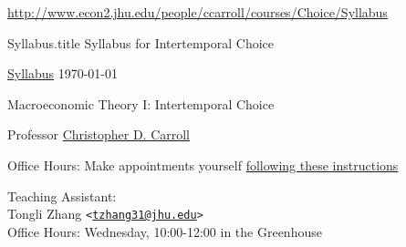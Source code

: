 \documentclass{\econtex}\newcommand{\texname}{Syllabus}
\begin{document}
\large
\begin{center}{{\tiny \url{http://www.econ2.jhu.edu/people/ccarroll/courses/Choice/Syllabus}}}\end{center}


\begin{verbatimwrite}{\texname.title}
Syllabus for Intertemporal Choice
\end{verbatimwrite}

\thispagestyle{empty}

\newenvironment{blockpar}{\par\begin{minipage}{\textwidth}
\setlength{\parskip}{.5\baselineskip plus 1pt minus 1pt}}{\end{minipage}}

\pagestyle{plain}
\thispagestyle{empty}

\begin{center}
{\tiny \href{http://www.econ2.jhu.edu/people/ccarroll/courses/Choice/Syllabus.pdf}{\texname} \hfill \today}


{\LARGE Macroeconomic Theory I: Intertemporal Choice}
\medskip\medskip
\medskip\medskip

\smallskip


Professor \href{http://www.econ2.jhu.edu/people/ccarroll}{Christopher D. Carroll}

\medskip

\medskip\medskip
Office Hours: Make appointments yourself \href{http://www.econ2.jhu.edu/people/ccarroll/calendar.html}{following these instructions}

\medskip\medskip\medskip
\small
Teaching Assistant:  \\
Tongli Zhang \texttt{<\href{mailto:tzhang31@jhu.edu}{\texttt{tzhang31@jhu.edu}}>}
\\ Office Hours: Wednesday, 10:00-12:00 in the Greenhouse
\normalsize
\medskip

\end{center}
\end{document}
